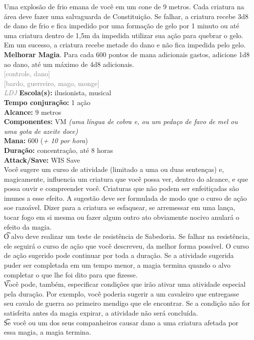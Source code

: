 \documentclass{RPG_Adventure}[2021/10/20]
\begin{document}
{\normalsize Uma explosão de frio emana de você em um cone de 9 metros. Cada criatura na área deve fazer uma salvaguarda de Constituição. Se falhar, a criatura recebe 3d8 de dano de frio e fica impedido por uma formação de gelo por 1 minuto ou até uma criatura dentro de 1,5m da impedida utilizar sua ação para quebrar o gelo. Em um sucesso, a criatura recebe metade do dano e não fica impedida pelo gelo.\\\t \textbf{Melhorar Magia}. Para cada 600 pontos de mana adicionais gastos, adicione 1d8 ao dano, até um máximo de 4d8 adicionais.\\}
{\scriptsize \textcolor{gray}{[controle, dano]\\}}
{\scriptsize \textcolor{gray}{[bardo, guerreiro, mago, monge]\\}}
{\tiny \textcolor{gray}{\textit{LDJ}}}\jump{}
{\small \t \textbf{Escola(s):} ilusionista, musical\\\t \textbf{Tempo conjuração:} 1 ação\\\t \textbf{Alcance:} 9 metros\\\t \textbf{Componentes:} VM \textit{(uma língua de cobra e, ou um pedaço de favo de mel ou uma gota de azeite doce)}\\\t \textbf{Mana:} 600 (\textit{+ 10 por hora})\\\t \textbf{Duração:} concentração, até 8 horas\\\t \textbf{Attack/Save:} WIS Save\\}
{\normalsize Você sugere um curso de atividade (limitado a uma ou duas sentenças) e, magicamente, influencia um criatura que você possa ver, dentro do alcance, e que possa ouvir e compreender você. Criaturas que não podem ser enfeitiçadas são imunes a esse efeito. A sugestão deve ser formulada de modo que o curso de ação soe razoável. Dizer para a criatura se esfaquear, se arremessar em uma lança, tocar fogo em si mesma ou fazer algum outro ato obviamente nocivo anulará o efeito da magia.\\\t O alvo deve realizar um teste de resistência de Sabedoria. Se falhar na resistência, ele seguirá o curso de ação que você descreveu, da melhor forma possível. O curso de ação sugerido pode continuar por toda a duração. Se a atividade sugerida puder ser completada em um tempo menor, a magia termina quando o alvo completar o que lhe foi dito para que fizesse.\\\t Você pode, também, especificar condições que irão ativar uma atividade especial pela duração. Por exemplo, você poderia sugerir a um cavaleiro que entregasse seu cavalo de guerra ao primeiro mendigo que ele encontrar. Se a condição não for satisfeita antes da magia expirar, a atividade não será concluída.\\\t Se você ou um dos seus companheiros causar dano a uma criatura afetada por essa magia, a magia termina.\\}
\end{document}
